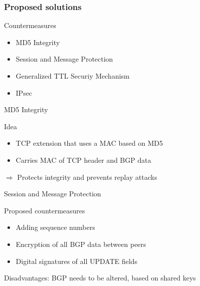 \documentclass[notes=hide,yellow]{beamer}
\begin{document}
\begin{frame}
	\frametitle{Proposed solutions}
	\begin{block}{Countermeasures}
	\begin{itemize}
		\item MD5 Integrity
		\item Session and Message Protection
		\item Generalized TTL Securiy Mechanism
		\item IPsec
	\end{itemize}
	\end{block}
\end{frame}


\begin{frame}{MD5 Integrity}
	\begin{block}{Idea}
	\begin{itemize}
		\item TCP extension that uses a MAC based on MD5
		\item Carries MAC of TCP header and BGP data
	\end{itemize}
	\end{block}
	$\Rightarrow$ Protects integrity and prevents replay attacks
\end{frame}
%
\begin{frame}{Session and Message Protection}
	\begin{block}{Proposed countermeasures}
	\begin{itemize}
		\item Adding sequence numbers
		\item Encryption of all BGP data between peers %
		\item Digital signatures of all UPDATE fields 
	\end{itemize}
	\end{block}
	Disadvantages: BGP needs to be altered, based on shared keys
\end{frame}
\end{document}
